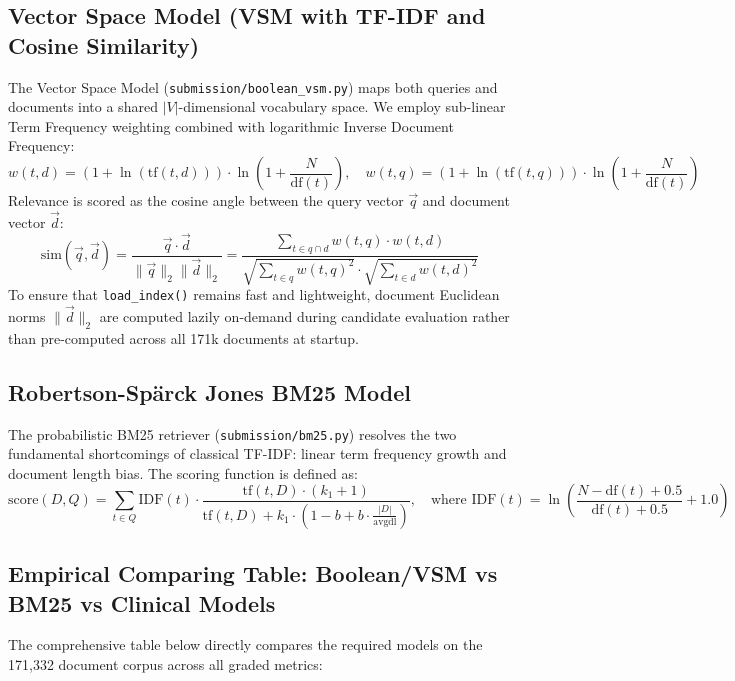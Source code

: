 ﻿\documentclass[9pt,a4paper]{article}
\begin{document}
\subsection{Vector Space Model (VSM with TF-IDF and Cosine Similarity)}
The Vector Space Model (\texttt{submission/boolean_vsm.py}) maps both queries and documents into a shared $|V|$-dimensional vocabulary space. We employ sub-linear Term Frequency weighting combined with logarithmic Inverse Document Frequency:
\begin{equation}
w(t, d) = (1 + \ln(\text{tf}(t, d))) \cdot \ln\left(1 + \frac{N}{\text{df}(t)}\right), \quad w(t, q) = (1 + \ln(\text{tf}(t, q))) \cdot \ln\left(1 + \frac{N}{\text{df}(t)}\right)
\end{equation}
Relevance is scored as the cosine angle between the query vector $\vec{q}$ and document vector $\vec{d}$:
\begin{equation}
\text{sim}(\vec{q}, \vec{d}) = \frac{\vec{q} \cdot \vec{d}}{\|\vec{q}\|_2 \|\vec{d}\|_2} = \frac{\sum_{t \in q \cap d} w(t, q) \cdot w(t, d)}{\sqrt{\sum_{t \in q} w(t, q)^2} \cdot \sqrt{\sum_{t \in d} w(t, d)^2}}
\end{equation}
To ensure that \texttt{load\_index()} remains fast and lightweight, document Euclidean norms $\|\vec{d}\|_2$ are computed lazily on-demand during candidate evaluation rather than pre-computed across all 171k documents at startup.

\subsection{Robertson-Sp\"arck Jones BM25 Model}
The probabilistic BM25 retriever (\texttt{submission/bm25.py}) resolves the two fundamental shortcomings of classical TF-IDF: linear term frequency growth and document length bias. The scoring function is defined as:
\begin{equation}
\text{score}(D, Q) = \sum_{t \in Q} \text{IDF}(t) \cdot \frac{\text{tf}(t, D) \cdot (k_1 + 1)}{\text{tf}(t, D) + k_1 \cdot \left(1 - b + b \cdot \frac{|D|}{\text{avgdl}}\right)}, \quad \text{where } \text{IDF}(t) = \ln\left(\frac{N - \text{df}(t) + 0.5}{\text{df}(t) + 0.5} + 1.0\right)
\end{equation}

\subsection{Empirical Comparing Table: Boolean/VSM vs BM25 vs Clinical Models}
The comprehensive table below directly compares the required models on the 171,332 document corpus across all graded metrics:
\end{document}

